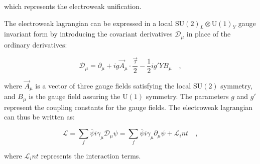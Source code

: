 which represents the electroweak unification. 
\begin{comment}
Also, the weak neutral current $J_\mu^{NC}$ can be written as a combination of $J_\mu^3$ and $j_\mu^{em}$ as follows:

\begin{equation}
J_\mu^{NC} = J_\mu^3 - \sin ^2 \theta_W j_\mu^{em} \quad,
\end{equation}

where $\theta_W$ is the Weinberg angle.
\end{comment}
The electroweak lagrangian can be expressed in a local $\mathrm{SU(2)}_L \otimes \mathrm{U(1)}_Y$ gauge invariant form by introducing the covariant derivatives $\mathcal{D}_\mu$ in place of the ordinary derivatives:

\begin{equation}
\mathcal{D}_\mu = \partial_\mu + i g \vec{A}_\mu \cdot \frac{\vec{\tau}}{2} - \frac{1}{2}i g' Y B_\mu \quad ,
\end{equation}

where $\vec{A}_\mu$ is a vector of three gauge fields satisfying the local $\mathrm{SU(2)}$ symmetry, and $B_\mu$ is the gauge field assuring the $\mathrm{U(1)}$ symmetry. The parameters $g$ and $g'$ represent the coupling constants for the gauge fields. The electroweak lagrangian can thus be written as:

\begin{equation}
\mathcal{L} = \sum_{f} \bar{\psi}i\gamma_\mu\mathcal{D}_\mu\psi = \sum_{f} \bar{\psi}i\gamma_\mu\partial_\mu\psi + \mathcal{L}_int \quad,
\end{equation}

where $\mathcal{L}_int$ represents the interaction terms.
